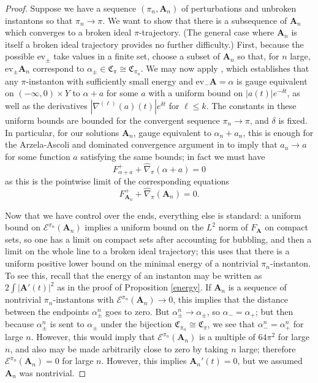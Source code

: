 \documentclass[10pt,a4paper]{amsart}
\theoremstyle{definition}
\theoremstyle{remark}
\numberwithin{figure}{qchap}
\begin{document}
\begin{proof}Suppose we have a sequence $(\pi_n, \mathbf{A}_n)$ of perturbations and unbroken instantons so that $\pi_n \to \pi$. We want to show that there is a subsequence of $\mathbf{A}_n$ which converges to a broken ideal $\pi$-trajectory. (The general case where $\mathbf{A}_n$ is itself a broken ideal trajectory provides no further difficulty.) First, because the possible $\text{ev}_\pm$ take values in a finite set, choose a subset of $\mathbf{A}_n$ so that, for $n$ large, $\text{ev}_\pm \mathbf{A}_n$ correspond to $\alpha_\pm \in \mathfrak C_\pi \cong \mathfrak C_{\pi_n}$. We may now apply \cite[Lemma~4.3]{Don}, which establishes that any $\pi$-instanton with sufficiently small energy and $\text{ev}_- \mathbf{A} = \alpha$ is gauge equivalent on $(-\infty, 0) \times Y$ to $\alpha + a$ for some $a$ with a uniform bound on $|a(t)| e^{-\delta t}$, as well as the derivatives $|\nabla^{(\ell)}(a)(t)| e^{\delta t}$ for $\ell \leq k$. The constants in these uniform bounds are bounded for the convergent sequence $\pi_n \to \pi$, and $\delta$ is fixed. In particular, for our solutions $\mathbf{A}_n$, gauge equivalent to $\alpha_n + a_n$, this is enough for the Arzela-Ascoli and dominated convergence argument in \cite[Lemma~5.1]{Don} to imply that $a_n \to a$ for some function $a$ satisfying the same bounds; in fact we must have 
$$F_{\alpha + a}^+ + \widehat{\nabla}_\pi(\alpha+a) = 0$$ 
as this is the pointwise limit of the corresponding equations 
$$F_{\mathbf{A}_n}^+ + \widehat{\nabla}_\pi(\mathbf{A}_n) = 0.$$

Now that we have control over the ends, everything else is standard: a uniform bound on $\mathcal E^{\pi_n}(\mathbf{A}_n)$ implies a uniform bound on the $L^2$ norm of $F_{\mathbf{A}}$ on compact sets, so one has a limit on compact sets after accounting for bubbling, and then a limit on the whole line to a broken ideal trajectory; this uses that there is a uniform positive lower bound on the minimal energy of a nontrivial $\pi_n$-instanton. To see this, recall that the energy of an instanton may be written as $2\int |\mathbf{A}'(t)|^2$ as in the proof of Proposition \ref{energy}. If $\mathbf{A}_n$ is a sequence of nontrivial $\pi_n$-instantons with $\mathcal E^{\pi_n}(\mathbf{A}_n) \to 0$, this implies that the distance between the endpoints $\alpha_\pm^n$ goes to zero. But $\alpha_{\pm}^n \to \alpha_\pm$, so $\alpha_- = \alpha_+$; but then because $\alpha^n_\pm$ is sent to $\alpha_\pm$ under the bijection $\mathfrak C_{\pi_n} \cong \mathfrak C_{\pi}$, we see that $\alpha_-^n = \alpha_+^n$ for large $n$. However, this would imply that $\mathcal E^{\pi_n}(\mathbf{A}_n)$ is a multiple of $64\pi^2$ for large $n$, and also may be made arbitrarily close to zero by taking $n$ large; therefore $\mathcal E^{\pi_n}(\mathbf{A}_n) = 0$ for large $n$. However, this implies $\mathbf{A}_n'(t) = 0$, but we assumed $\mathbf{A}_n$ was nontrivial.


\end{proof}
\end{document}
